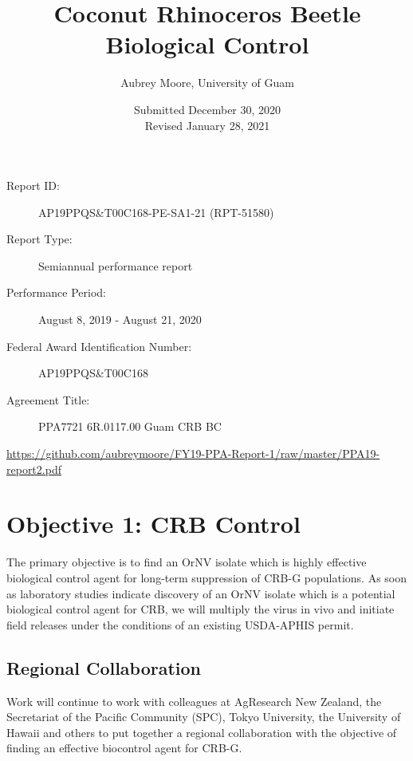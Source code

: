 \documentclass[12pt,letterpaper,english,bibliography=totocnumbered,abstract=on]{scrartcl}
\begin{document}
\titlehead{USDA-APHIS Progress Report}
\title{Coconut Rhinoceros Beetle Biological Control}
\author{Aubrey Moore, University of Guam}
\date{Submitted December 30, 2020\\Revised January 28, 2021}
\maketitle
\begin{description}	
	\item[Report ID:] AP19PPQS\&T00C168-PE-SA1-21 (RPT-51580)
	\item[Report Type:] Semiannual performance report
	\item[Performance Period:] August 8, 2019 - August 21, 2020
	\item[Federal Award Identification Number:] AP19PPQS\&T00C168
	\item[Agreement Title:] PPA7721 6R.0117.00 Guam CRB BC
\end{description}

\begin{footnotesize}
\url{https://github.com/aubreymoore/FY19-PPA-Report-1/raw/master/PPA19-report2.pdf}
\end{footnotesize}

\newpage{}
\tableofcontents{}

\newpage

\listoftodos

\newpage

\section{Objective 1: CRB Control}

The primary objective is to find an OrNV isolate which is highly effective biological control agent for long-term suppression of CRB-G populations. As soon as laboratory studies indicate discovery of an OrNV isolate which is a potential biological control agent for CRB, we will multiply the virus in vivo and initiate field releases under the conditions of an existing USDA-APHIS permit.

\subsection{Regional Collaboration}

Work will continue to work with colleagues at AgResearch New Zealand, the Secretariat of the Pacific Community (SPC), Tokyo University, the University of Hawaii and others to put together a regional collaboration with the objective of finding an effective biocontrol agent for CRB-G.
\end{document}
